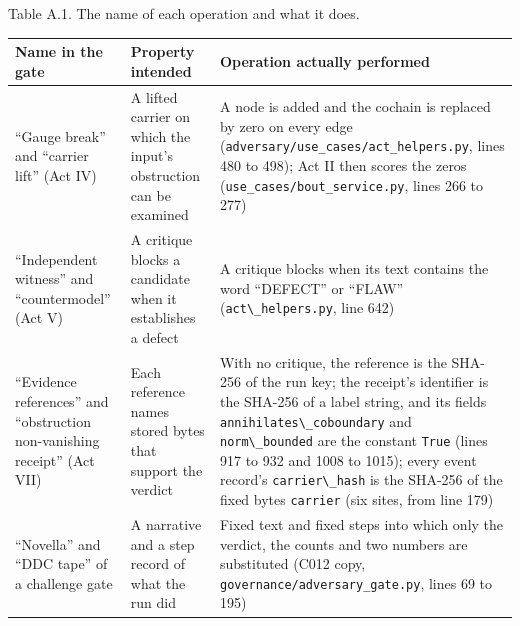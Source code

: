 \documentclass[
  11pt,
]{article}
\newcommand{\passthrough}[1]{#1}
\begin{document}
Table A.1. The name of each operation and what it does.

\begin{longtable}[]{@{}
  >{\raggedright\arraybackslash}p{}
  >{\raggedright\arraybackslash}p{}
  >{\raggedright\arraybackslash}p{}@{}}
\toprule\noalign{}
\begin{minipage}[b]{\linewidth}\raggedright
Name in the gate
\end{minipage} & \begin{minipage}[b]{\linewidth}\raggedright
Property intended
\end{minipage} & \begin{minipage}[b]{\linewidth}\raggedright
Operation actually performed
\end{minipage} \\
\midrule\noalign{}
\endhead
\bottomrule\noalign{}
\endlastfoot
``Gauge break'' and ``carrier lift'' (Act IV) & A lifted carrier on
which the input's obstruction can be examined & A node is added and the
cochain is replaced by zero on every edge
(\nolinkurl{adversary/use_cases/act_helpers.py}, lines 480 to
498); Act II then scores the zeros
(\nolinkurl{use_cases/bout_service.py}, lines 266 to 277) \\
``Independent witness'' and ``countermodel'' (Act V) & A critique blocks
a candidate when it establishes a defect & A critique blocks when its
text contains the word ``DEFECT'' or ``FLAW''
(\passthrough{\lstinline!act\_helpers.py!}, line 642) \\
``Evidence references'' and ``obstruction non-vanishing receipt'' (Act
VII) & Each reference names stored bytes that support the verdict & With
no critique, the reference is the SHA-256 of the run key; the receipt's
identifier is the SHA-256 of a label string, and its fields
\passthrough{\lstinline!annihilates\_coboundary!} and
\passthrough{\lstinline!norm\_bounded!} are the constant
\passthrough{\lstinline!True!} (lines 917 to 932 and 1008 to 1015);
every event record's \passthrough{\lstinline!carrier\_hash!} is the
SHA-256 of the fixed bytes \passthrough{\lstinline!carrier!} (six sites,
from line 179) \\
``Novella'' and ``DDC tape'' of a challenge gate & A narrative and a
step record of what the run did & Fixed text and fixed steps into which
only the verdict, the counts and two numbers are substituted (C012 copy,
\nolinkurl{governance/adversary_gate.py}, lines 69 to 195) \\
\end{longtable}
\end{document}
